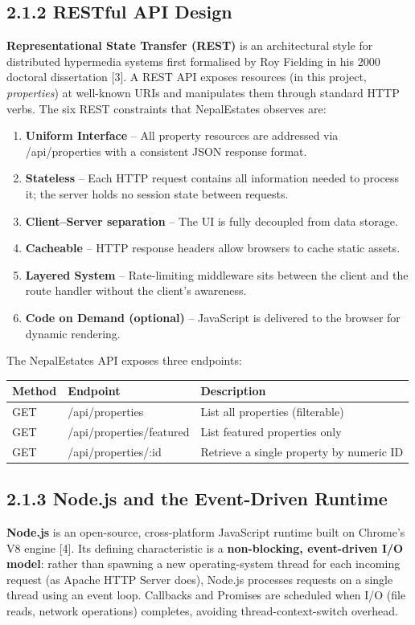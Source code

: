 \documentclass[12pt,a4paper]{report}
\begin{document}
\subsection{2.1.2 RESTful API Design}
\textbf{Representational State Transfer (REST)} is an architectural style for distributed hypermedia systems first formalised by Roy Fielding in his 2000 doctoral dissertation [3]. A REST API exposes resources (in this project, \textit{properties}) at well-known URIs and manipulates them through standard HTTP verbs. The six REST constraints that NepalEstates observes are:

\begin{enumerate}
  \item \textbf{Uniform Interface} -- All property resources are addressed via /api/properties with a consistent JSON response format.
  \item \textbf{Stateless} -- Each HTTP request contains all information needed to process it; the server holds no session state between requests.
  \item \textbf{Client--Server separation} -- The UI is fully decoupled from data storage.
  \item \textbf{Cacheable} -- HTTP response headers allow browsers to cache static assets.
  \item \textbf{Layered System} -- Rate-limiting middleware sits between the client and the route handler without the client's awareness.
  \item \textbf{Code on Demand (optional)} -- JavaScript is delivered to the browser for dynamic rendering.
\end{enumerate}
The NepalEstates API exposes three endpoints:


\begin{center}
\begin{tabular}{|l|l|l|}
\hline
Method & Endpoint & Description \\
\hline
GET & /api/properties & List all properties (filterable) \\
\hline
GET & /api/properties/featured & List featured properties only \\
\hline
GET & /api/properties/:id & Retrieve a single property by numeric ID \\
\hline
\end{tabular}
\end{center}

\subsection{2.1.3 Node.js and the Event-Driven Runtime}
\textbf{Node.js} is an open-source, cross-platform JavaScript runtime built on Chrome's V8 engine [4]. Its defining characteristic is a \textbf{non-blocking, event-driven I/O model}: rather than spawning a new operating-system thread for each incoming request (as Apache HTTP Server does), Node.js processes requests on a single thread using an event loop. Callbacks and Promises are scheduled when I/O (file reads, network operations) completes, avoiding thread-context-switch overhead.
\end{document}
